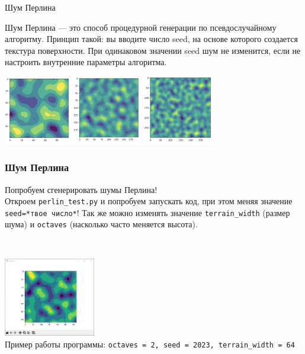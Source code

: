 \documentclass[handout]{beamer}
\begin{document}
    \begin{frame}{Шум Перлина}
        \begin{justify}
            Шум Перлина — это способ процедурной генерации по псевдослучайному алгоритму. Принцип такой: вы вводите число seed, на основе которого создается текстура поверхности.
            При одинаковом значении seed шум не изменится, если не настроить внутренние параметры алгоритма.
        \end{justify}
        \begin{center}
            \includegraphics[width=0.7\textwidth]{img/perlin_noise.png}
        \end{center}
    \end{frame}

    \begin{frame}
        \frametitle{Шум Перлина}
        \begin{justify}
            Попробуем сгенерировать шумы Перлина!\\
            Откроем \texttt{perlin\_test.py} и попробуем запускать код, при этом меняя значение \texttt{seed=*твое число*}!
            Так же можно изменять значение \texttt{terrain\_width} (размер шума) и \texttt{octaves} (насколько часто меняется высота).
        \end{justify} \\
        \begin{center}
            \includegraphics[width=0.3\textwidth]{img/perlin_test.png} \\ 
            Пример работы программы: \texttt{octaves = 2, seed = 2023, terrain\_width = 64}
        \end{center}
    \end{frame}
\end{document}
